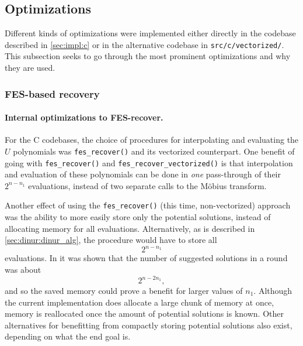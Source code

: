 \subsection{Optimizations} \label{sec:impl:opt}
Different kinds of optimizations were implemented either directly in the codebase described in \cref{sec:impl:c} or in the alternative codebase in \texttt{src/c/vectorized/}. This subsection seeks to go through the most prominent optimizations and why they are used.

\subsubsection{FES-based recovery} \label{sec:impl:opt:fes_rec}
\paragraph{Internal optimizations to FES-recover.} For the C codebases, the choice of procedures for interpolating and evaluating the $U$ polynomials was \texttt{fes\_recover()} and its vectorized counterpart. One benefit of going with \texttt{fes\_recover()} and \texttt{fes\_recover\_vectorized()} is that interpolation and evaluation of these polynomials can be done in \textit{one} pass-through of their $2^{n - n_1}$ evaluations, instead of two separate calls to the Möbius transform.

Another effect of using the \texttt{fes\_recover()} (this time, non-vectorized) approach was the ability to more easily store only the potential solutions, instead of allocating memory for all evaluations. Alternatively, as is described in \cref{sec:dinur:dinur_alg}, the procedure would have to store all 
$$
    2^{n - n_1}
$$ 
evaluations. In \cite{eurocrypt-2021-30841} it was shown that the number of suggested solutions in a round was about 
$$
    2^{n - 2n_1},
$$
and so the saved memory could prove a benefit for larger values of $n_1$. Although the current implementation does allocate a large chunk of memory at once, memory is reallocated once the amount of potential solutions is known. Other alternatives for benefitting from compactly storing potential solutions also exist, depending on what the end goal is.

